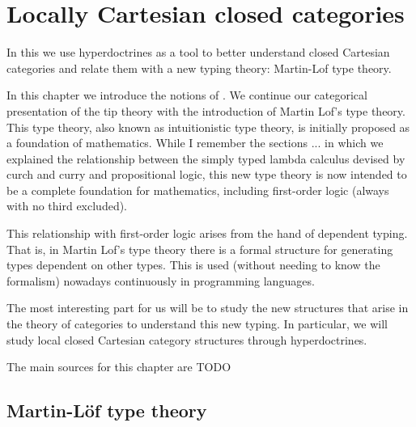 
\chapter{Locally Cartesian closed categories}
\label{chap:5}
\thispagestyle{empty}

 In this we use hyperdoctrines as a tool to better understand closed Cartesian categories and relate them with a new typing theory: Martin-Lof type theory.

In this chapter we introduce the notions of \cite{seely1984locally}. We continue our categorical presentation of the tip theory with the introduction of Martin Lof's type theory. This type theory, also known as intuitionistic type theory, is initially proposed as a foundation of mathematics. While I remember the sections ... in which we explained the relationship between the simply typed lambda calculus devised by curch and curry and propositional logic, this new type theory is now intended to be a complete foundation for mathematics, including first-order logic (always with no third excluded).

This relationship with first-order logic arises from the hand of dependent typing. That is, in Martin Lof's type theory there is a formal structure for generating types dependent on other types. This is used (without needing to know the formalism) nowadays continuously in programming languages. 

The most interesting part for us will be to study the new structures that arise in the theory of categories to understand this new typing. In particular, we will study local closed Cartesian category structures through hyperdoctrines. 

The main sources for this chapter are {\color{red} TODO}



\section{Martin-Löf type theory}